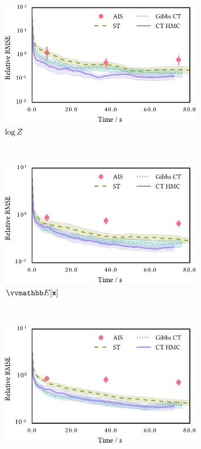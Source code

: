 \begin{figure}
\centering
\begin{subfigure}[b]{.7\linewidth}
\vskip 0pt
\centering
\includegraphics[width=0.95\textwidth]{images/continuous-tempering/gaussian-bm-relaxation-30-unit-scale-6-log-norm-rmses} 
\caption{$\log Z$}\label{sfig:bmr-30-unit-scale-6-log-norm}
\end{subfigure}
\\[5mm]
\begin{subfigure}[b]{.7\linewidth}
\vskip 0pt
\centering
\includegraphics[width=0.95\textwidth]{images/continuous-tempering/gaussian-bm-relaxation-30-unit-scale-6-mean-rmses}
\caption{$\expc{\rvct{x}}$}\label{sfig:bmr-30-unit-scale-6-mean}
\end{subfigure}
\\[5mm]
\begin{subfigure}[b]{.7\linewidth}
\vskip 0pt
\centering
\includegraphics[width=0.95\textwidth]{images/continuous-tempering/gaussian-bm-relaxation-30-unit-scale-6-covariance-rmses} 

\end{subfigure}
\end{figure}
